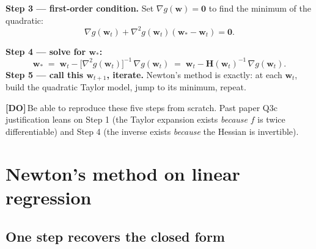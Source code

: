 \documentclass[11pt, a4paper]{article}
\newcommand{\doflag}{\textcolor{defBd}{\textbf{[DO]}}\,}
\begin{document}
\textbf{Step 3 — first-order condition.} Set $\nabla g(\mathbf{w}) = \mathbf{0}$ to find the minimum of the quadratic:
\[
\nabla g(\mathbf{w}_t) + \nabla^2 g(\mathbf{w}_t)(\mathbf{w}_*-\mathbf{w}_t) = \mathbf{0}.
\]

\textbf{Step 4 — solve for $\mathbf{w}_*$:}
\[
\mathbf{w}_* \;=\; \mathbf{w}_t - \big[\nabla^2 g(\mathbf{w}_t)\big]^{-1}\,\nabla g(\mathbf{w}_t) \;=\; \mathbf{w}_t - \mathbf{H}(\mathbf{w}_t)^{-1}\,\nabla g(\mathbf{w}_t).
\]
\textbf{Step 5 — call this $\mathbf{w}_{t+1}$, iterate.} Newton's method is exactly: at each $\mathbf{w}_t$, build the quadratic Taylor model, jump to its minimum, repeat.

\doflag{}Be able to reproduce these five steps from scratch. Past paper Q3c justification leans on Step 1 (the Taylor expansion exists \emph{because} $f$ is twice differentiable) and Step 4 (the inverse exists \emph{because} the Hessian is invertible).

\section{Newton's method on linear regression}

\subsection{One step recovers the closed form}
\end{document}
